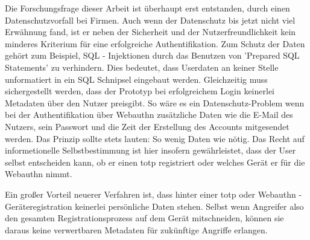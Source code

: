 \begin{itemize}
Die Forschungsfrage dieser Arbeit ist überhaupt erst entstanden, durch einen Datenschutzvorfall bei Firmen. Auch wenn der Datenschutz bis jetzt nicht viel Erwähnung fand, ist er neben der Sicherheit und der Nutzerfreundlichkeit kein minderes Kriterium für eine erfolgreiche Authentifikation. Zum Schutz der Daten gehört zum Beispiel, SQL - Injektionen durch das Benutzen von 'Prepared SQL Statements' zu verhindern. Dies bedeutet, dass Userdaten an keiner Stelle unformatiert in ein SQL Schnipsel eingebaut werden. Gleichzeitig muss sichergestellt werden, dass der Prototyp bei erfolgreichem Login keinerlei Metadaten über den Nutzer preisgibt. So wäre es ein Datenschutz-Problem wenn bei der Authentifikation über Webauthn zusätzliche Daten wie die E-Mail des Nutzers, sein Passwort und die Zeit der Erstellung des Accounts mitgesendet werden. Das Prinzip sollte stets lauten: So wenig Daten wie nötig. Das Recht auf informetionelle Selbstbestimmung ist hier insofern gewährleistet, dass der User selbst entscheiden kann, ob er einen \ac{totp} registriert oder welches Gerät er für die Webauthn nimmt.
\newpage

Ein großer Vorteil neuerer Verfahren ist, dass hinter einer \ac{totp} oder Webauthn - Geräteregistration keinerlei persönliche Daten stehen. Selbst wenn Angreifer also den gesamten Registrationsprozess auf dem Gerät mitschneiden, können sie daraus keine verwertbaren Metadaten für zukünftige Angriffe erlangen.
\end{itemize}
